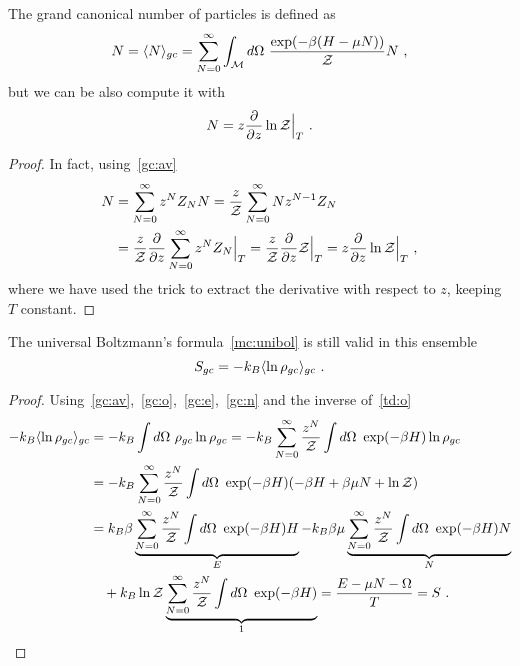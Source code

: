     The grand canonical number of particles is defined as
    \begin{equation}\label{gc:n}
        N = \langle N\rangle_{gc} = \sum_{N = 0}^{\infty} \int_{\mathcal M} d\Omega ~ \frac{\exp (-\beta (H - \mu N ))}{\mathcal Z} N ~,
    \end{equation}
    but we can be also compute it with
    \begin{equation}\label{gc:n2}
        N = z \frac{\partial}{\partial z} \ln \mathcal Z \Big \vert_T ~.
    \end{equation}
    \begin{proof}
        In fact, using~\eqref{gc:av}
        \begin{equation*}
        \begin{aligned}
            N & = \sum_{N=0}^{\infty} z^N Z_N N = \frac{z}{\mathcal Z} \sum_{N=0}^{\infty} N z^{N-1} Z_N \\ & = \frac{z}{\mathcal Z} \frac{\partial}{\partial z} \sum_{N=0}^{\infty} z^N Z_N \Big \vert_T = \frac{z}{\mathcal Z} \frac{\partial}{\partial z}\mathcal Z \Big \vert_T = z \frac{\partial}{\partial z} \ln \mathcal Z \Big \vert_T ~,
        \end{aligned}
        \end{equation*}
        where we have used the trick to extract the derivative with respect to $z$, keeping $T$ constant.
    \end{proof}

    The universal Boltzmann's formula~\eqref{mc:unibol} is still valid in this ensemble
    \begin{equation*}
        S_{gc} = - k_B \langle\ln \rho_{gc}\rangle_{gc} ~.
    \end{equation*}
    \begin{proof}
        Using~\eqref{gc:av},~\eqref{gc:o},~\eqref{gc:e},~\eqref{gc:n} and the inverse of~\eqref{td:o}
        \begin{equation*}
        \begin{aligned}
            - k_B \langle\ln \rho_{gc}\rangle_{gc} & = -k_B \int d\Omega ~ \rho_{gc} \ln \rho_{gc} = -k_B \sum_{N=0}^{\infty} \frac{z^N}{\mathcal Z} \int d\Omega ~ \exp(- \beta H) \ln \rho_{gc} \\ & = -k_B \sum_{N=0}^{\infty} \frac{z^N}{\mathcal Z} \int d\Omega ~ \exp(- \beta H) (- \beta H + \beta \mu N + \ln \mathcal Z) \\ & = k_B \beta \underbrace{\sum_{N=0}^{\infty} \frac{z^N}{\mathcal Z} \int d\Omega ~ \exp(-\beta H) H}_{E} - k_B \beta \mu \underbrace{\sum_{N=0}^{\infty} \frac{z^N}{\mathcal Z} \int d\Omega ~ \exp(-\beta H) N}_{N} \\ & \quad + k_B \ln \mathcal Z \underbrace{\sum_{N=0}^{\infty} \frac{z^N}{\mathcal Z} \int d\Omega ~ \exp(-\beta H)}_{1} = \frac{E - \mu N - \Omega}{T} = S ~.
        \end{aligned}
        \end{equation*}
    \end{proof}

